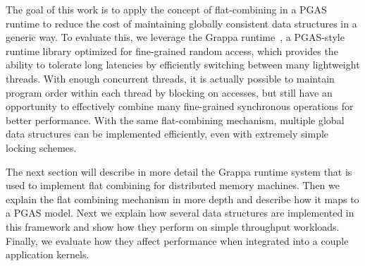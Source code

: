 The goal of this work is to apply the concept of flat-combining in a PGAS runtime to reduce the cost of maintaining globally consistent data structures in a generic way.
To evaluate this, we leverage the Grappa runtime~\cite{Nelson:hotpar11-real}, a PGAS-style runtime library optimized for fine-grained random access, which provides the ability to tolerate long latencies by efficiently switching between many lightweight threads.
With enough concurrent threads, it is actually possible to maintain program order within each thread by blocking on accesses, but still have an opportunity to effectively combine many fine-grained synchronous operations for better performance.
With the same flat-combining mechanism, multiple global data structures can be implemented efficiently, even with extremely simple locking schemes.

The next section will describe in more detail the Grappa runtime system that is used to implement flat combining for distributed memory machines. Then we explain the flat combining mechanism in more depth and describe how it maps to a PGAS model. Next we explain how several data structures are implemented in this framework and show how they perform on simple throughput workloads. Finally, we evaluate how they affect performance when integrated into a couple application kernels.
